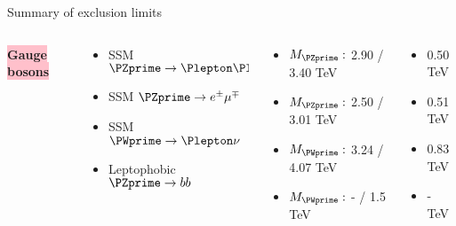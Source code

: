 \documentclass[8pt]{beamer}
\newcommand{\mySmallCenterBox}[2][pink] {
   {\centering
    \noindent\colorbox{#1}{
	\textbf{{\small #2}}
    }\par
  }
}
\begin{document}
\begin{frame}{\large Summary of exclusion limits}
  \begin{columns}
  \begin{column}{3cm}
    \mySmallCenterBox{Gauge bosons}
  \end{column}
  \begin{column}{3cm}
    \begin{itemize}
     \item[\EightAsterisk] SSM $\PZprime \to \Plepton\Plepton$
     \item[\EightAsterisk] SSM $\PZprime \to e^{\pm}\mu^{\mp}$
     \item[\EightAsterisk] SSM $\PWprime \to \Plepton\nu$
     \item[\EightAsterisk] Leptophobic $\PZprime \to bb$
    \end{itemize}
  \end{column}
  \begin{column}{3.3cm}
    \begin{itemize}
     \item[] $M_{\PZprime}:$ 2.90 / 3.40 TeV
     \item[] $M_{\PZprime}:$ 2.50 / 3.01 TeV
     \item[] $M_{\PWprime}:$ 3.24 / 4.07 TeV
     \item[] $M_{\PWprime}:$ -    / 1.5 TeV
    \end{itemize}
  \end{column}
  \begin{column}{2.7cm}
    \begin{itemize}
     \item[] 0.50 TeV
     \vspace{0.09cm}
     \item[] 0.51 TeV
     \vspace{0.09cm}
     \item[] 0.83 TeV
     \vspace{0.09cm}
     \item[] - TeV
    \end{itemize}
  \end{column}
 \end{columns}
 
 \vspace{0.2cm}
 

\end{frame}
\end{document}

